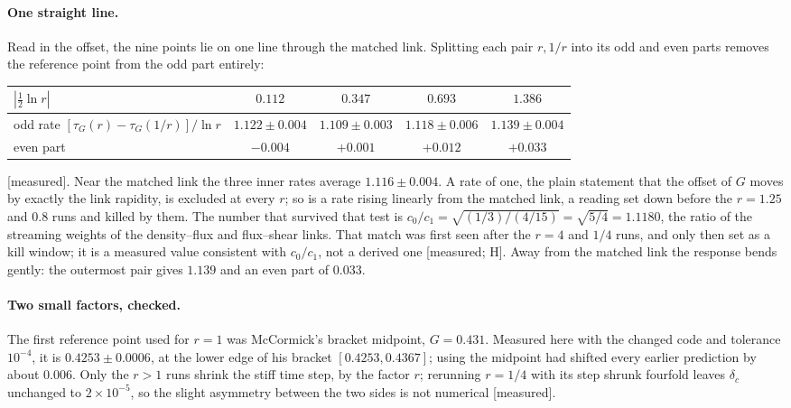 \documentclass[11pt]{article}
\newcommand{\grade}[1]{\textsf{\small[#1]}}
\begin{document}
\paragraph{One straight line.} Read in the offset, the nine points lie on one line through the matched link. Splitting each pair $r,1/r$ into its odd and even parts removes the reference point from the odd part entirely:
\begin{center}\begin{tabular}{lcccc}\toprule
$|\tfrac12\ln r|$ & $0.112$ & $0.347$ & $0.693$ & $1.386$\\\midrule
odd rate $[\tau_G(r)-\tau_G(1/r)]/\ln r$ & $1.122\pm0.004$ & $1.109\pm0.003$ & $1.118\pm0.006$ & $1.139\pm0.004$\\
even part & $-0.004$ & $+0.001$ & $+0.012$ & $+0.033$\\\bottomrule\end{tabular}\end{center}
\grade{measured}. Near the matched link the three inner rates average $1.116\pm0.004$. A rate of one, the plain statement that the offset of $G$ moves by exactly the link rapidity, is excluded at every $r$; so is a rate rising linearly from the matched link, a reading set down before the $r=1.25$ and $0.8$ runs and killed by them. The number that survived that test is $c_0/c_1=\sqrt{(1/3)/(4/15)}=\sqrt{5/4}=1.1180$, the ratio of the streaming weights of the density--flux and flux--shear links. That match was first seen after the $r=4$ and $1/4$ runs, and only then set as a kill window; it is a measured value consistent with $c_0/c_1$, not a derived one \grade{measured; H}. Away from the matched link the response bends gently: the outermost pair gives $1.139$ and an even part of $0.033$.

\paragraph{Two small factors, checked.} The first reference point used for $r=1$ was McCormick's bracket midpoint, $G=0.431$. Measured here with the changed code and tolerance $10^{-4}$, it is $0.4253\pm0.0006$, at the lower edge of his bracket $[0.4253,0.4367]$; using the midpoint had shifted every earlier prediction by about $0.006$. Only the $r>1$ runs shrink the stiff time step, by the factor $r$; rerunning $r=1/4$ with its step shrunk fourfold leaves $\delta_c$ unchanged to $2\times10^{-5}$, so the slight asymmetry between the two sides is not numerical \grade{measured}.
\end{document}
